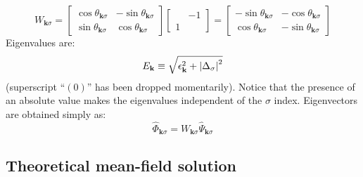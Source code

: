 \begin{equation}\label{appeq:W-explicit-form}
	W_{\mathbf{k}\sigma} = \begin{bmatrix}
		\cos \theta_{\mathbf{k}\sigma} & - \sin \theta_{\mathbf{k}\sigma} \\
		\sin \theta_{\mathbf{k}\sigma} & \cos \theta_{\mathbf{k}\sigma}
	\end{bmatrix} \begin{bmatrix}
		& -1 \\
		1 &
	\end{bmatrix} = \begin{bmatrix}
		- \sin \theta_{\mathbf{k}\sigma} & - \cos \theta_{\mathbf{k}\sigma} \\ 
		\cos \theta_{\mathbf{k}\sigma} & - \sin \theta_{\mathbf{k}\sigma}
	\end{bmatrix}
\end{equation}
Eigenvalues are:
\[
	E_\mathbf{k} \equiv \sqrt{\epsilon_{\mathbf{k}}^2 + \abs{\Delta_\sigma}^2}
\]
(superscript ``$(0)$'' has been dropped momentarily). Notice that the presence of an absolute value makes the eigenvalues independent of the $\sigma$ index. Eigenvectors are obtained simply as:
\[
	\hat \Phi_{\mathbf{k}\sigma} = W_{\mathbf{k}\sigma} \hat \Psi_{\mathbf{k}\sigma}
\]
\todo

\subsection{Theoretical mean-field solution}

